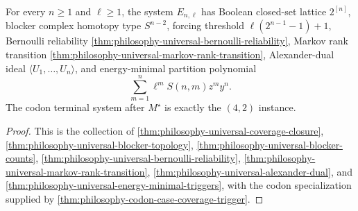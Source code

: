 \begin{theorem}
\label{thm:philosophy-universal-coverage-trigger-algebra-theorem}
For every $n\geq1$ and $\ell\geq1$, the system
$E_{n,\ell}$ has Boolean closed-set lattice $2^{[n]}$, blocker complex
homotopy type $S^{n-2}$, forcing threshold
$\ell(2^{n-1}-1)+1$, Bernoulli reliability
\autoref{thm:philosophy-universal-bernoulli-reliability}, Markov rank
transition \autoref{thm:philosophy-universal-markov-rank-transition},
Alexander-dual ideal
$\langle U_{1},\ldots,U_{n}\rangle$, and energy-minimal partition
polynomial
$$
  \sum_{m=1}^{n}\ell^{m}S(n,m)z^{m}y^{n}.
$$
The codon terminal system after $M^{\star}$ is exactly the
$(4,2)$ instance.
\end{theorem}
\begin{proof}
This is the collection of
\autoref{thm:philosophy-universal-coverage-closure},
\autoref{thm:philosophy-universal-blocker-topology},
\autoref{thm:philosophy-universal-blocker-counts},
\autoref{thm:philosophy-universal-bernoulli-reliability},
\autoref{thm:philosophy-universal-markov-rank-transition},
\autoref{thm:philosophy-universal-alexander-dual}, and
\autoref{thm:philosophy-universal-energy-minimal-triggers}, with the
codon specialization supplied by
\autoref{thm:philosophy-codon-case-coverage-trigger}.
\end{proof}

